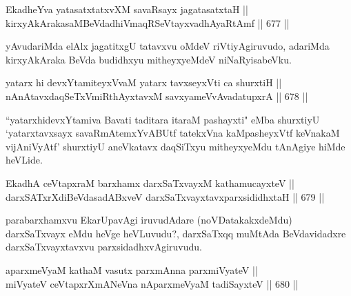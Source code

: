 \begin{shl}
EkadheYva yatasatxtatxvXM savaRsayx jagatasatxtaH || \\
kirxyAkArakasaMBeVdadhiVmaqRSeVtayxvadhAyaRtAmf \hfill || 677 ||  
\end{shl}

\begin{artha} 
yAvudariMda elAlx jagatitxgU tatavxvu oMdeV riVtiyAgiruvudo, adariMda 
kirxyAkAraka BeVda budidhxyu mitheyxyeMdeV niNaRyisabeVku.
\end{artha}


\begin{shl}
yatarx hi devxYtamiteyxVvaM yatarx tavxseyxVti ca shurxtiH || \\
nAnAtavxdaqSeTxVmiRthAyxtavxM savxyameVvAvadatupxrA \hfill || 678 ||  
\end{shl}

\begin{artha} 
``yatarxhidevxYtamiva Bavati taditara itaraM pashayxti" eMba shurxtiyU `yatarxtavxsayx savaRmAtemxYvABUtf tatekxVna kaMpasheyxVtf keVnakaM vijAniVyAtf' shurxtiyU aneVkatavx daqSiTxyu mitheyxyeMdu tAnAgiye hiMde heVLide.
\end{artha}


\begin{shl}
EkadhA ceVtapxraM barxhamx darxSaTxvayxM kathamucayxteV || \\
darxSATxrXdiBeVdasadABxveV darxSaTxvayxtavxparxsididhxtaH \hfill || 679 ||  
\end{shl}

\begin{artha} 
parabarxhamxvu EkarUpavAgi iruvudAdare (noVDatakakxdeMdu) darxSaTxvayx eMdu heVge heVLuvudu?, darxSaTxqq muMtAda BeVdavidadxre darxSaTxvayxtavxvu parxsidadhxvAgiruvudu.
\end{artha}


\begin{shl}
aparxmeVyaM kathaM vasutx parxmAnna parxmiVyateV || \\
miVyateV ceVtapxrXmANeVna nAparxmeVyaM tadiSayxteV \hfill || 680 ||  
\end{shl}

